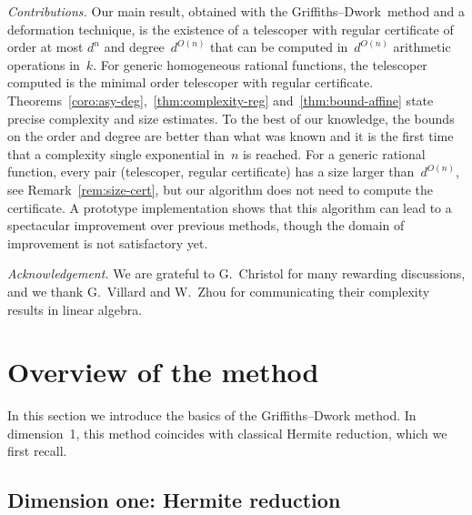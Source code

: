 \documentclass{sig-alternate}
\newcommand{\GD}{Griffiths--Dwork}
\begin{document}
\medskip
\noindent\emph{Contributions.}
Our main result, obtained with the \GD\ method and a deformation technique, is the existence of a telescoper with regular certificate of order at most $d^n$ and degree~$d^{O(n)}$ that can be computed in~$d^{O(n)}$ arithmetic operations in~$k$.
For generic homogeneous rational functions, the telescoper computed is the minimal order telescoper with regular certificate.
Theorems~\ref{coro:asy-deg},~\ref{thm:complexity-reg} and~\ref{thm:bound-affine} state precise complexity and size estimates. 
To the best of our knowledge, the bounds on the order and degree are better than what was known and it is the first time that a complexity single exponential in~$n$ is reached.
For a generic rational function, every pair (telescoper, regular certificate) has a size larger than~$d^{O(n)}$, see Remark~\ref{rem:size-cert}, but our algorithm does not need to compute the certificate.
A prototype implementation shows that this algorithm can lead
to a spectacular improvement over previous methods, though the domain of improvement is not  satisfactory yet.

\medskip
\noindent\emph{Acknowledgement.}
We are grateful to G.~Christol for
many rewarding discussions, and we thank G.~Villard and W.~Zhou for communicating  their complexity results in linear algebra.





\section{Overview of the method}

\noindent In this section we introduce the basics of the Griffiths--Dwork method.
In dimension~1, this method coincides with classical Hermite reduction, which we first recall.

\subsection{Dimension one: Hermite reduction}\label{sec:hermite}
\end{document}
